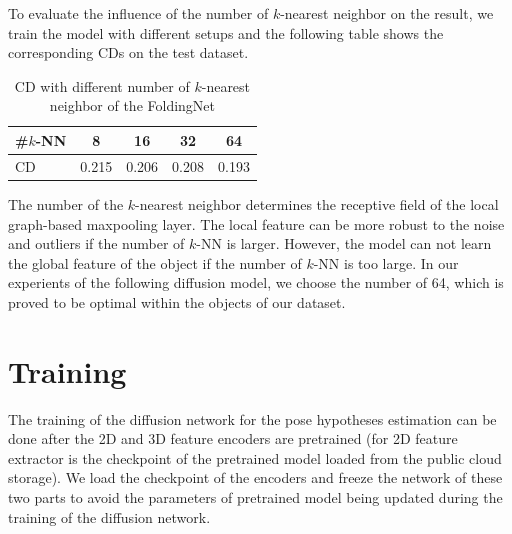 \documentclass[12pt,DIV14,BCOR12mm,a4paper,footinclude=false,headinclude,parskip=half-,twoside,openright,cleardoublepage=empty,toc=index,bibliography=totoc,listof=totoc]{scrreprt}
\numberwithin{equation}{chapter}
\begin{document}
To evaluate the influence of the number of $k$-nearest neighbor on the result, we train the model with different setups and the following table shows the corresponding CDs on the test dataset.
\begin{table}[h]
  \centering
  \caption{CD with different number of $k$-nearest neighbor of the FoldingNet}
  \label{tab:fold_knn}
  \begin{tabular}{l c c c c}
    \toprule
    \#$k$-NN & 8 & 16 & 32 & 64\\
    \midrule
    CD & 0.215 & 0.206 & 0.208 & 0.193\\
    \bottomrule
  \end{tabular}
\end{table}

The number of the $k$-nearest neighbor determines the receptive field of the local graph-based maxpooling layer. The local feature can be more robust to the noise and outliers if the number of $k$-NN is larger. However, the model can not learn the global feature of the object if the number of $k$-NN is too large. In our experients of the following diffusion model, we choose the number of 64, which is proved to be optimal within the objects of our dataset.

\section{Training} 
The training of the diffusion network for the pose hypotheses estimation can be done after the 2D and 3D feature encoders are pretrained (for 2D feature extractor is the checkpoint of the pretrained model loaded from the public cloud storage). We load the checkpoint of the encoders and freeze the network of these two parts to avoid the parameters of pretrained model being updated during the training of the diffusion network. 
\end{document}

